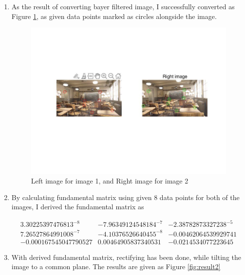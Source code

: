 \begin{enumerate}
    \item As the result of converting bayer filtered image, I successfully converted as Figure  \ref{fig:result1}, as given data points marked as circles alongside the image. 
    
    \begin{figure}[h]
    \centering
    \includegraphics[width=13cm]{figure1.jpg}
    \caption{Left image for image 1, and Right image for image 2}
    \label{fig:result1} 
    \end{figure}
    
    \item By calculating fundamental matrix using given 8 data points for both of the images, I derived 
    the fundamental matrix as 
    
    \begin{equation}
        \begin{matrix}
        3.30225397476813^{-8}& -7.96349124548184^{-7}& -2.38782873327238^{-5}\\
        7.26527864991008^{-7}& -4.10376526640455^{-8}& -0.00462064539929741\\
        -0.000167545047790527& 0.00464905837340531& -0.0214534077223645
        \end{matrix}
    \end{equation}
    
    \item With derived fundamental matrix, rectifying has been done, while tilting the image to a common plane. The results are given as Figure \ref{fig:result2} 


\end{enumerate}
